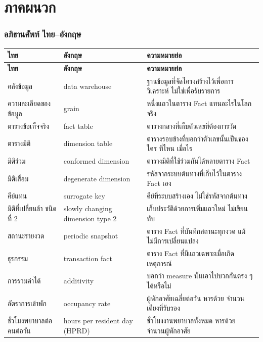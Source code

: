 \documentclass[11pt,a4paper]{article}
\newcommand{\sansall}{\sffamily}
\begin{document}
\clearpage

\appendix
\part*{ภาคผนวก}

\section{อภิธานศัพท์ ไทย--อังกฤษ}

\begin{longtable}{L{3.9cm}L{4.2cm}L{7.2cm}}
\toprule
\sansall\bfseries ไทย & \sansall\bfseries อังกฤษ &
\sansall\bfseries ความหมายย่อ \\
\midrule
\endfirsthead
\toprule
\sansall\bfseries ไทย & \sansall\bfseries อังกฤษ &
\sansall\bfseries ความหมายย่อ \\
\midrule
\endhead
\bottomrule
\endfoot
คลังข้อมูล & data warehouse & ฐานข้อมูลที่จัดโครงสร้างไว้เพื่อการวิเคราะห์ ไม่ใช่เพื่อรับรายการ \\
ความละเอียดของข้อมูล & grain & หนึ่งแถวในตาราง Fact แทนอะไรในโลกจริง \\
ตารางข้อเท็จจริง & fact table & ตารางกลางที่เก็บตัวเลขที่ต้องการวัด \\
ตารางมิติ & dimension table & ตารางรอบข้างที่บอกว่าตัวเลขนั้นเป็นของใคร ที่ไหน เมื่อไร \\
มิติร่วม & conformed dimension & ตารางมิติที่ใช้ร่วมกันได้หลายตาราง Fact \\
มิติเสื่อม & degenerate dimension & รหัสจากระบบต้นทางที่เก็บไว้ในตาราง Fact เอง \\
คีย์แทน & surrogate key & คีย์ที่ระบบสร้างเอง ไม่ใช่รหัสจากต้นทาง \\
มิติที่เปลี่ยนช้า ชนิดที่ 2 & slowly changing dimension type 2 & เก็บประวัติด้วยการเพิ่มแถวใหม่ ไม่เขียนทับ \\
สถานะรายงวด & periodic snapshot & ตาราง Fact ที่บันทึกสถานะทุกงวด แม้ไม่มีการเปลี่ยนแปลง \\
ธุรกรรม & transaction fact & ตาราง Fact ที่มีแถวเฉพาะเมื่อเกิดเหตุการณ์ \\
การรวมค่าได้ & additivity & บอกว่า measure นั้นเอาไปบวกกันตรง ๆ ได้หรือไม่ \\
อัตราการเข้าพัก & occupancy rate & ผู้พักอาศัยเฉลี่ยต่อวัน หารด้วย จำนวนเตียงที่รับรอง \\
ชั่วโมงพยาบาลต่อคนต่อวัน & hours per resident day (HPRD) & ชั่วโมงงานพยาบาลทั้งหมด หารด้วย จำนวนผู้พักอาศัย \\

\end{longtable}
\end{document}

